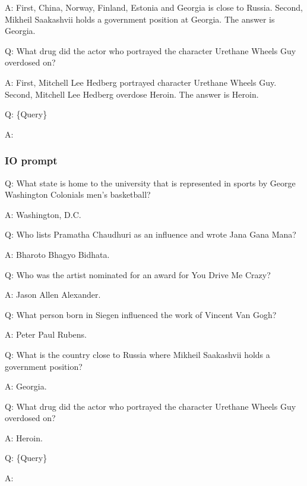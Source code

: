 \documentclass{article} %
\begin{document}
A: First, China, Norway, Finland, Estonia and Georgia is close to Russia. Second, Mikheil Saakashvii holds a government position at Georgia. The answer is Georgia.

Q: What drug did the actor who portrayed the character Urethane Wheels Guy overdosed on?

A: First, Mitchell Lee Hedberg portrayed character Urethane Wheels Guy. Second, Mitchell Lee Hedberg overdose Heroin. The answer is Heroin.

Q: \{Query\} 

A: 
\subsubsection{IO prompt}
Q: What state is home to the university that is represented in sports by George Washington Colonials men's basketball?

A: Washington, D.C.

Q: Who lists Pramatha Chaudhuri as an influence and wrote Jana Gana Mana?

A: Bharoto Bhagyo Bidhata.

Q: Who was the artist nominated for an award for You Drive Me Crazy?

A: Jason Allen Alexander.

Q: What person born in Siegen influenced the work of Vincent Van Gogh?

A: Peter Paul Rubens.

Q: What is the country close to Russia where Mikheil Saakashvii holds a government position?

A: Georgia.

Q: What drug did the actor who portrayed the character Urethane Wheels Guy overdosed on?

A: Heroin.

Q: \{Query\} 

A: 
\end{document}
